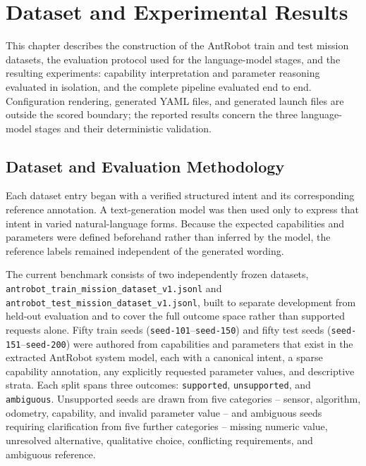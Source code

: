 \chapter{Dataset and Experimental Results}
\label{chap:dataset-results}

This chapter describes the construction of the AntRobot train and test mission datasets, the evaluation protocol used for the language-model stages, and the resulting experiments: capability interpretation and parameter reasoning evaluated in isolation, and the complete pipeline evaluated end to end. Configuration rendering, generated YAML files, and generated launch files are outside the scored boundary; the reported results concern the three language-model stages and their deterministic validation.

\section{Dataset and Evaluation Methodology}
\label{sec:extended-datasets}

Each dataset entry began with a verified structured intent and its corresponding reference annotation. A text-generation model was then used only to express that intent in varied natural-language forms. Because the expected capabilities and parameters were defined beforehand rather than inferred by the model, the reference labels remained independent of the generated wording.

The current benchmark consists of two independently frozen datasets, \texttt{antrobot\_train\_mission\_dataset\_v1.jsonl} and \texttt{antrobot\_test\_mission\_dataset\_v1.jsonl}, built to separate development from held-out evaluation and to cover the full outcome space rather than supported requests alone. Fifty train seeds (\texttt{seed-101}--\texttt{seed-150}) and fifty test seeds (\texttt{seed-151}--\texttt{seed-200}) were authored from capabilities and parameters that exist in the extracted AntRobot system model, each with a canonical intent, a sparse capability annotation, any explicitly requested parameter values, and descriptive strata. Each split spans three outcomes: \texttt{supported}, \texttt{unsupported}, and \texttt{ambiguous}. Unsupported seeds are drawn from five categories -- sensor, algorithm, odometry, capability, and invalid parameter value -- and ambiguous seeds requiring clarification from five further categories -- missing numeric value, unresolved alternative, qualitative choice, conflicting requirements, and ambiguous reference.

